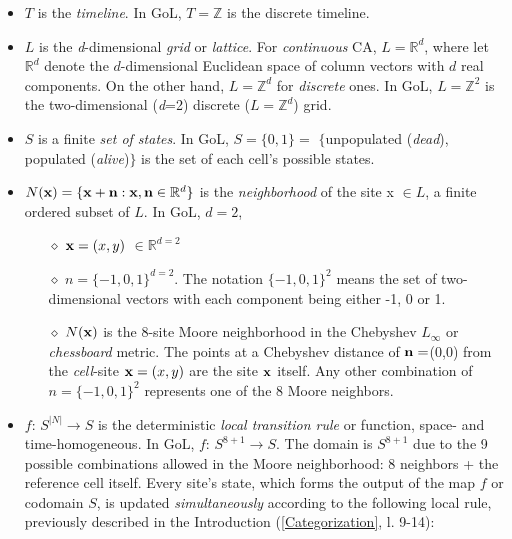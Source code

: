 \documentclass[11pt]{article}
\numberwithin{equation}{section} %
\numberwithin{figure}{section} %
\begin{document}
\begin{itemize}
 
 \item $T$ is the \emph{timeline}. In GoL, $T=\mathbb{Z}$ is the discrete timeline. 

 \item $L$ is the \emph{d}-dimensional  \emph{grid} or \emph{lattice}. For \emph{continuous} CA, $L=\mathbb{R}^d$, where let $\mathbb{R}^d$ denote the  $d$-dimensional Euclidean space of column vectors with $d$ real components. On the other hand, $L=\mathbb{Z}^d$ for \emph{discrete} ones. In GoL, $L=\mathbb{Z}^2$ is the two-dimensional (\emph{d}=2) discrete ($L=\mathbb{Z}^d$) grid.
 
 
 \item $S$ is a finite \emph{set of states}. In GoL, $S=\{0,1\}=$ $\{$unpopulated (\emph{dead}), populated (\emph{alive})$\}$ is the set of each cell's possible states.
 
 \item $N({\bf x})=\{ {\bf x}+{\bf n} : {\bf x},{\bf n} \in \mathbb{R}^d \}$ is the \emph{neighborhood} of the site x $\in L$, a finite ordered subset of $L$. In GoL, ${d=2}$, 
 
\begin{itemize}
\item[$\diamond$] ${\bf x}=(x,y)$ $\in\mathbb{R}^{d=2}$
\item[$\diamond$] $n=\{-1,0,1\}^{d=2}$. The notation $\{-1,0,1\}^{2}$ means the set of two-dimensional vectors with each component being either -1, 0 or 1. \cite[p.~16, l.~23-24]{Nielsen}
\item[$\diamond$] $N({\bf x})$ is the 8-site Moore neighborhood in the Chebyshev $L_\infty$ or \emph{chessboard} metric. The points at a Chebyshev distance of ${\bf n}=$(0,0) from the \emph{cell}-site ${\bf x}=(x,y)$ are the site  ${\bf x}$ itself. Any other combination of $n=\{-1,0,1\}^{2}$ represents one of the 8 Moore neighbors.
\end{itemize}
 
   

 \item $f:\,S^{|N|}\rightarrow S$ is the deterministic \emph{local transition rule} or function, space- and time-homogeneous.
  In GoL, $f:\,S^{8+1}\rightarrow S$. The domain is $S^{8+1}$  due to the 9 possible combinations allowed in the Moore neighborhood: 8 neighbors + the reference cell itself. Every site's state, which forms the output of the map $f$ or codomain $S$, is updated \emph{simultaneously} according to the following local rule, previously described in the Introduction (\ref{Categorization}, l. 9-14):
 

\end{itemize}
\end{document}
